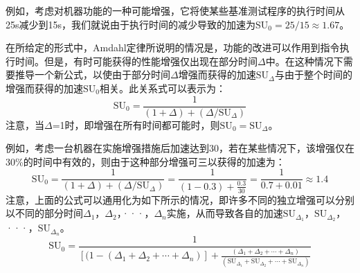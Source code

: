 例如，考虑对机器功能的一种可能增强，它将使某些基准测试程序的执行时间从25s减少到15s，我们就说由于执行时间的减少导致的加速为$\text{SU}_0=25/15\approx 1.67$。

在所给定的形式中，Amdahl定律所说明的情况是，功能的改进可以作用到指令执行时间。但是，有时可能获得的性能增强仅出现在部分时间$\Delta$中。在这种情况下需要推导一个新公式，以使由于部分时间$\Delta$增强而获得的加速$\text{SU}_{\Delta}$与由于整个时间的增强而获得的加速$\text{SU}_0$相关。此关系式可以表示为：
$$\text{SU}_0=\frac{1}{(1+\Delta)+(\Delta/\text{SU}_{\Delta})}$$
注意，当$\Delta$=1时，即增强在所有时间都可能时，则$\text{SU}_0=\text{SU}_{\Delta}$。

例如，考虑一台机器在实施增强措施后加速达到30，若在某些情况下，该增强仅在30\%的时间中有效的，则由于这种部分增强可三以获得的加速为：
$$\text{SU}_0=\frac{1}{(1+\Delta)+(\Delta/\text{SU}_{\Delta})}=\frac{1}{(1-0.3)+\frac{0.3}{30}}=\frac{1}{0.7+0.01}\approx1.4$$
注意，上面的公式可以通用化为如下所示的情况，即许多不同的独立增强可以分别以不同的部分时间$\Delta_1$，$\Delta_2$，···，$\Delta_n$实施，从而导致各自的加速$\text{SU}_{\Delta_1}$，$\text{SU}_{\Delta_2}$，···，$\text{SU}_{\Delta_n}$。
$$\text{SU}_0=\frac{1}{[(1-(\Delta_1+\Delta_2+\cdots+\Delta_n)]+\frac{(\Delta_1+\Delta_2+\cdots+\Delta_n)}{(\text{SU}_{\Delta_1}+\text{SU}_{\Delta_2}+\cdots+\text{SU}_{\Delta_n})}}$$





